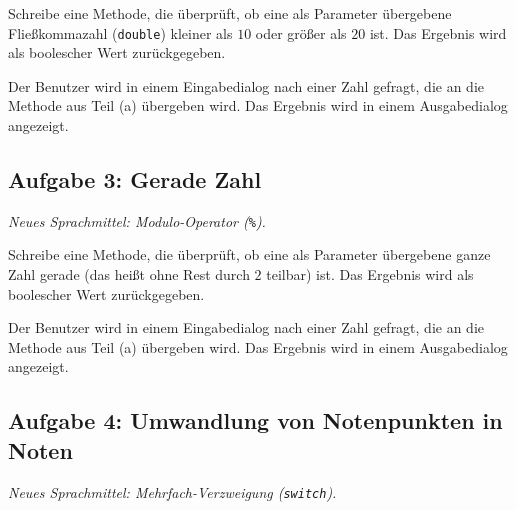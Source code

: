 \begin{compactenum}[a)]
\item Schreibe eine Methode, die überprüft, ob eine als Parameter übergebene
Fließkommazahl (\lstinline|double|) kleiner als $10$ oder größer als $20$ ist.
Das Ergebnis wird als boolescher Wert zurückgegeben.

\item Der Benutzer wird in einem Eingabedialog nach einer Zahl gefragt, die an
die Methode aus Teil (a) übergeben wird. Das Ergebnis wird in einem
Ausgabedialog angezeigt.
\end{compactenum}


\subsection{Aufgabe 3: Gerade Zahl \tagPflicht}
\noindent \emph{Neues Sprachmittel: Modulo-Operator (\texttt{\%}).}

\begin{compactenum}[a)]
\item Schreibe eine Methode, die überprüft, ob eine als Parameter übergebene
ganze Zahl gerade (das heißt ohne Rest durch $2$ teilbar) ist. Das Ergebnis
wird als boolescher Wert zurückgegeben.

\item Der Benutzer wird in einem Eingabedialog nach einer Zahl gefragt, die an
die Methode aus Teil (a) übergeben wird. Das Ergebnis wird in einem
Ausgabedialog angezeigt.
\end{compactenum}


\subsection{Aufgabe 4: Umwandlung von Notenpunkten in Noten \tagPflicht}
\noindent \emph{Neues Sprachmittel: Mehrfach-Verzweigung (\texttt{switch}).}

